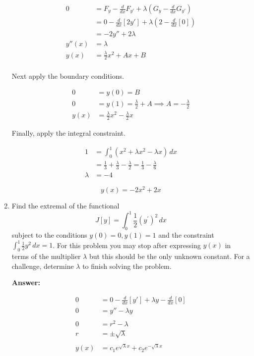 \documentclass[12pt]{article}
\begin{document}
\begin{enumerate}
\begin{align*}
0 &= F_y - \frac{d}{dx}F_{y'} + \lambda (G_y - \frac{d}{dx}G_{y'}) \\
&= 0 - \frac{d}{dx}[2y'] + \lambda (2 - \frac{d}{dx}[0]) \\
&= -2y''  + 2\lambda \\
y''(x) &= \lambda \\
y(x) &= \frac{\lambda}{2}x^2 + Ax + B \\
\end{align*}

Next apply the boundary conditions.

\begin{align*}
0 &= y(0) = B \\
0 &= y(1) = \frac{\lambda}{2} + A \implies A = -\frac{\lambda}{2} \\
y(x) &= \frac{\lambda}{2}x^2 - \frac{\lambda}{2}x
\end{align*}

Finally, apply the integral constraint.

\begin{align*}
1 &= \int_0^1 \left(x^2 + \lambda x^2 - \lambda x \right) \, dx \\
&= \frac{1}{3} + \frac{\lambda}{3} - \frac{\lambda}{2} = \frac{1}{3} -\frac{\lambda}{6} \\
\lambda &= -4
\end{align*}

$$\boxed{ y(x) = -2x^2+2x } $$

\newpage

\item Find the extremal of the functional
$$
J[y] = \int_0^1 \frac{1}{2} (y^{\prime})^2 \,dx
$$
subject to the conditions $y(0) = 0, y(1) = 1$ and the constraint $\int_0^1 \frac{1}{2}y^2 \,dx = 1$. For this problem   you may stop after expressing $y(x)$ in terms of the multiplier $\lambda$ but this should be the only unknown constant. For a challenge, determine $\lambda$ to finish solving the problem.

{\bf Answer:} 

\begin{align*}
0 &= 0 - \frac{d}{dx}[y'] + \lambda y - \frac{d}{dx}[0] \\
0 &= y'' - \lambda y \\
&\\
0 &= r^2 - \lambda \\
r &= \pm \sqrt{\lambda} \\
& \\
y(x) &= c_1e^{\sqrt{\lambda}x} + c_2 e^{-\sqrt{\lambda}x} \\
\end{align*}


\end{enumerate}
\end{document}
